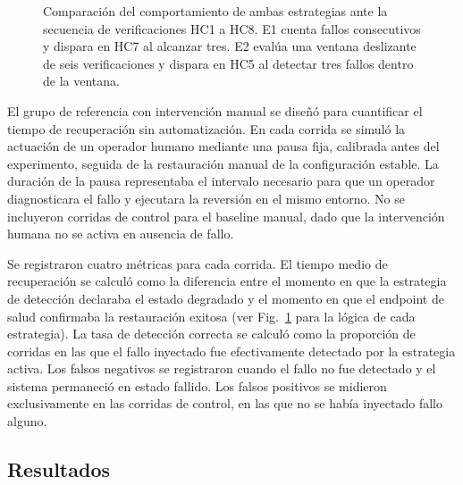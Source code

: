 \documentclass[conference]{IEEEtran}
\begin{document}
\begin{figure}[t]
\caption{Comparaci\'on del comportamiento de ambas estrategias ante la secuencia de verificaciones HC1 a HC8. E1 cuenta fallos consecutivos y dispara en HC7 al alcanzar tres. E2 eval\'ua una ventana deslizante de seis verificaciones y dispara en HC5 al detectar tres fallos dentro de la ventana.}
\label{fig:estrategias}
\end{figure}

El grupo de referencia con intervenci\'on manual se dise\~n\'o para cuantificar el tiempo de recuperaci\'on sin automatizaci\'on. En cada corrida se simul\'o la actuaci\'on de un operador humano mediante una pausa fija, calibrada antes del experimento, seguida de la restauraci\'on manual de la configuraci\'on estable. La duraci\'on de la pausa representaba el intervalo necesario para que un operador diagnosticara el fallo y ejecutara la reversi\'on en el mismo entorno. No se incluyeron corridas de control para el baseline manual, dado que la intervenci\'on humana no se activa en ausencia de fallo.

Se registraron cuatro m\'etricas para cada corrida. El tiempo medio de recuperaci\'on se calcul\'o como la diferencia entre el momento en que la estrategia de detecci\'on declaraba el estado degradado y el momento en que el endpoint de salud confirmaba la restauraci\'on exitosa (ver Fig.~\ref{fig:estrategias} para la l\'ogica de cada estrategia). La tasa de detecci\'on correcta se calcul\'o como la proporci\'on de corridas en las que el fallo inyectado fue efectivamente detectado por la estrategia activa. Los falsos negativos se registraron cuando el fallo no fue detectado y el sistema permaneci\'o en estado fallido. Los falsos positivos se midieron exclusivamente en las corridas de control, en las que no se hab\'ia inyectado fallo alguno.

\subsection{Resultados}
\end{document}
